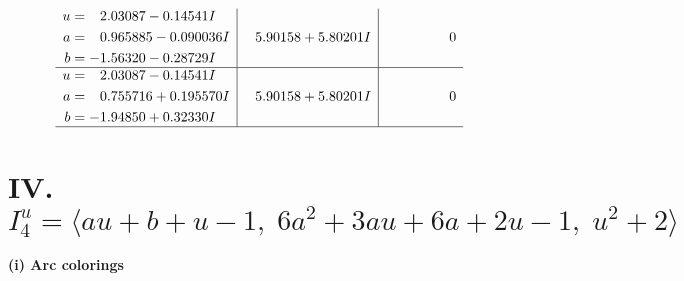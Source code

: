 \documentclass[1p]{elsarticle_modified}
\theoremstyle{definition}
\begin{document}
$$\begin{array}{c|c|c}
\begin{aligned}
u &= \phantom{-}2.03087 - 0.14541 I \\
a &= \phantom{-}0.965885 - 0.090036 I \\
b &= -1.56320 - 0.28729 I\end{aligned}
 & \phantom{-}5.90158 + 5.80201 I & \phantom{-0.000000 } 0 \\ \hline\begin{aligned}
u &= \phantom{-}2.03087 - 0.14541 I \\
a &= \phantom{-}0.755716 + 0.195570 I \\
b &= -1.94850 + 0.32330 I\end{aligned}
 & \phantom{-}5.90158 + 5.80201 I & \phantom{-0.000000 } 0\\
 \hline 
 \end{array}$$\newpage\newpage\renewcommand{\arraystretch}{1}
\centering \section*{IV. $I^u_{4}= \langle a u+b+u-1,\;6 a^2+3 a u+6 a+2 u-1,\;u^2+2 \rangle$}
\flushleft \textbf{(i) Arc colorings}\\
\end{document}
